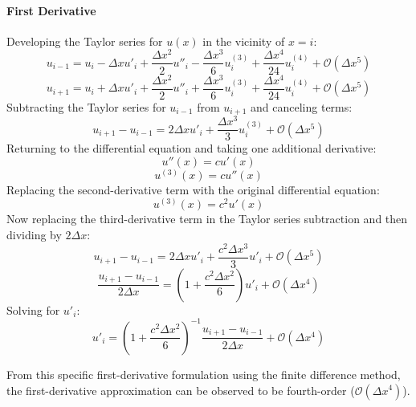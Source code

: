 \documentclass[10pt, reqno]{article}		%
\numberwithin{equation}{section}
\begin{document}
\paragraph{First Derivative}
Developing the Taylor series for $u(x)$ in the vicinity of $x = i$:
\begin{equation}
u_{i-1} = u_i - \Delta x u'_i + \frac{\Delta x^2}{2} u''_i - \frac{\Delta x^3}{6} u^{(3)}_i + \frac{\Delta x^4}{24} u^{(4)}_i + \mathcal{O}(\Delta x^5)
\end{equation}
\begin{equation}
u_{i+1} = u_i + \Delta x u'_i + \frac{\Delta x^2}{2} u''_i + \frac{\Delta x^3}{6} u^{(3)}_i + \frac{\Delta x^4}{24} u^{(4)}_i + \mathcal{O}(\Delta x^5)
\end{equation}
Subtracting the Taylor series for $u_{i-1}$ from $u_{i+1}$ and canceling terms:
\begin{equation}
u_{i+1} - u_{i-1} = 2\Delta xu'_i + \frac{\Delta x^3}{3} u^{(3)}_i + \mathcal{O}(\Delta x^5)
\end{equation}
Returning to the differential equation and taking one additional derivative:
\begin{equation}
u''(x)=cu'(x)
\end{equation}
\begin{equation}
u^{(3)}(x)=cu''(x)
\end{equation}
Replacing the second-derivative term with the original differential equation:
\begin{equation}
u^{(3)}(x) = c^2u'(x)
\end{equation}
Now replacing the third-derivative term in the Taylor series subtraction and then dividing by $2\Delta x$:
\begin{equation}
u_{i+1} - u_{i-1} = 2\Delta xu'_i + \frac{c^2\Delta x^3}{3}u'_i  + \mathcal{O}(\Delta x^5)
\end{equation}
\begin{equation}
\frac{u_{i+1} - u_{i-1}}{2\Delta x} = \left(1 + \frac{c^2\Delta x^2}{6}\right)u'_i  + \mathcal{O}(\Delta x^4)
\end{equation}
Solving for $u'_i$:
\begin{equation}
u'_i = \left(1 + \frac{c^2\Delta x^2}{6}\right)^{-1} \frac{u_{i+1} - u_{i-1}}{2\Delta x} + \mathcal{O}(\Delta x^4)
\end{equation}

From this specific first-derivative formulation using the finite difference method, the first-derivative approximation can be observed to be fourth-order ($\mathcal{O}(\Delta x^4)$).
\end{document}
